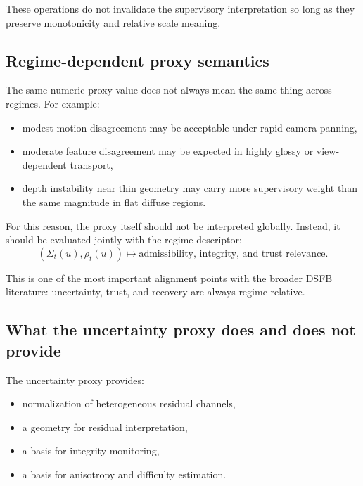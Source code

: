\documentclass[11pt]{article}
\theoremstyle{definition}
\theoremstyle{plain}
\begin{document}
These operations do not invalidate the supervisory interpretation so long as they preserve monotonicity and relative scale meaning.


\subsection{Regime-dependent proxy semantics}

The same numeric proxy value does not always mean the same thing across regimes. For example:
\begin{itemize}[leftmargin=1.5em]
    \item modest motion disagreement may be acceptable under rapid camera panning,
    \item moderate feature disagreement may be expected in highly glossy or view-dependent transport,
    \item depth instability near thin geometry may carry more supervisory weight than the same magnitude in flat diffuse regions.
\end{itemize}

For this reason, the proxy itself should not be interpreted globally. Instead, it should be evaluated jointly with the regime descriptor:
\begin{equation}
(\Sigma_t(u),\rho_t(u)) \mapsto \text{admissibility, integrity, and trust relevance}.
\end{equation}

This is one of the most important alignment points with the broader DSFB literature: uncertainty, trust, and recovery are always regime-relative.


\subsection{What the uncertainty proxy does and does not provide}

The uncertainty proxy provides:
\begin{itemize}[leftmargin=1.5em]
    \item normalization of heterogeneous residual channels,
    \item a geometry for residual interpretation,
    \item a basis for integrity monitoring,
    \item a basis for anisotropy and difficulty estimation.
\end{itemize}
\end{document}
